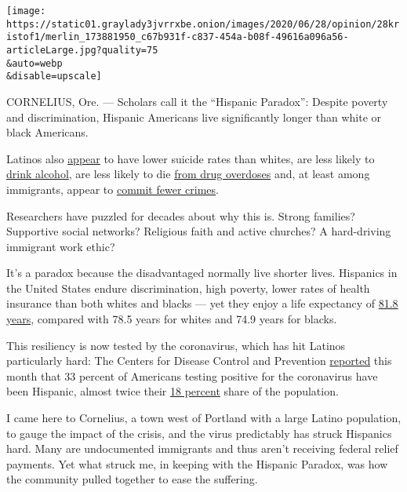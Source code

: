 \texttt{[image: https://static01.graylady3jvrrxbe.onion/images/2020/06/28/opinion/28kristof1/merlin\_173881950\_c67b931f-c837-454a-b08f-49616a096a56-articleLarge.jpg?quality=75\\\&auto=webp\\\&disable=upscale]}

CORNELIUS, Ore. --- Scholars call it the ``Hispanic Paradox'': Despite
poverty and discrimination, Hispanic Americans live significantly longer
than white or black Americans.

Latinos also
\href{https://www.cdc.gov/nchs/data/series/sr_02/sr02_172.pdf}{appear}
to have lower suicide rates than whites, are less likely to
\href{https://www.niaaa.nih.gov/publications/brochures-and-fact-sheets/alcohol-and-hispanic-community}{drink
alcohol}, are less likely to die
\href{https://www.cdc.gov/mmwr/volumes/69/wr/mm6911a4.htm\#T1_down}{from
drug overdoses} and, at least among immigrants, appear to
\href{https://www.politifact.com/factchecks/2017/aug/03/antonio-villaraigosa/mostly-true-undocumented-immigrants-less-likely-co/}{commit
fewer crimes}.

Researchers have puzzled for decades about why this is. Strong families?
Supportive social networks? Religious faith and active churches? A
hard-driving immigrant work ethic?

It's a paradox because the disadvantaged normally live shorter lives.
Hispanics in the United States endure discrimination, high poverty,
lower rates of health insurance than both whites and blacks --- yet they
enjoy a life expectancy of
\href{https://www.cdc.gov/nchs/data/nvsr/nvsr68/nvsr68_07-508.pdf}{81.8
years}, compared with 78.5 years for whites and 74.9 years for blacks.

This resiliency is now tested by the coronavirus, which has hit Latinos
particularly hard: The Centers for Disease Control and Prevention
\href{https://www.cdc.gov/mmwr/volumes/69/wr/mm6924e2.htm?s_cid=mm6924e2_w}{reported}
this month that 33 percent of Americans testing positive for the
coronavirus have been Hispanic, almost twice their
\href{https://www.census.gov/quickfacts/fact/table/US/RHI725218}{18
percent} share of the population.

I came here to Cornelius, a town west of Portland with a large Latino
population, to gauge the impact of the crisis, and the virus predictably
has struck Hispanics hard. Many are undocumented immigrants and thus
aren't receiving federal relief payments. Yet what struck me, in keeping
with the Hispanic Paradox, was how the community pulled together to ease
the suffering.

